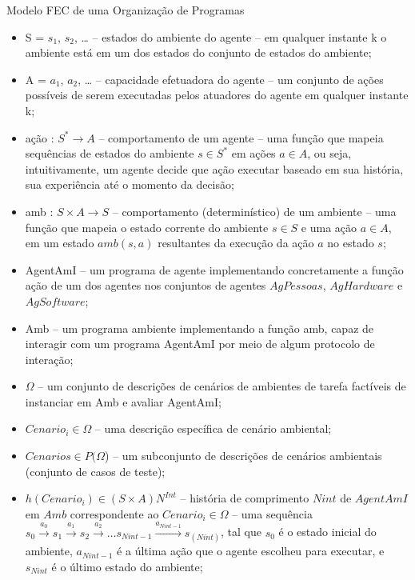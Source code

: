 \begin{section}{Modelo FEC de uma Organização de Programas}
    \begin{itemize}
        
        \item S = {$s_1$, $s_2$, \ldots} -- estados do ambiente do agente – em qualquer instante k o ambiente está em um dos estados do conjunto de estados do ambiente;
        
        \item A = {$a_1$, $a_2$, \ldots} -- capacidade efetuadora do agente – um conjunto de ações possíveis de serem executadas pelos atuadores do agente em qualquer instante k;
        
        \item ação : $S^*  \rightarrow A$ -- comportamento de um agente -- uma função que mapeia sequências de estados do ambiente $s \in S^*$ em ações $a \in A$, ou seja, intuitivamente, um agente decide que ação executar baseado em sua história, sua experiência até o momento da decisão;
        
        \item amb : $S\times A  \rightarrow S$ -- comportamento (determinístico) de um ambiente – uma função que mapeia o estado corrente do ambiente $s \in S$ e uma ação $a \in A$, em um estado $amb(s,a)$ resultantes da execução da ação $a$ no estado $s$;
        
        \item AgentAmI -- um programa de agente implementando concretamente a função ação de um dos agentes nos conjuntos de agentes $AgPessoas$, $AgHardware$ e $AgSoftware$;
        
        \item Amb -- um programa ambiente implementando a função amb, capaz de interagir com um programa AgentAmI por meio de algum protocolo de interação;
        
        \item $\Omega$ -- um conjunto de descrições de cenários de ambientes de tarefa factíveis de instanciar em Amb e avaliar AgentAmI;
        
        \item $Cenario_i \in \Omega$ -- uma descrição específica de cenário ambiental;
        
        \item $Cenarios \in P(\Omega$) -- um subconjunto de descrições de cenários ambientais (conjunto de casos de teste);
        
        \item $h(Cenario_i) \in (S\times A)N^{Int}$ -- história de comprimento $Nint$ de $AgentAmI$ em $Amb$ correspondente ao $Cenario_i \in \Omega$ – uma sequência $s_0 \xrightarrow{a_0} s_1 \xrightarrow{a_1} s_2 \xrightarrow{a_2} \ldots s_{Nint-1} \xrightarrow{a_{Nint-1}} s_(Nint)$, tal que $s_0$ é o estado inicial do ambiente, $a_{Nint-1}$ é a última ação que o agente escolheu para executar, e $s_{Nint}$ é o último estado do ambiente;
        

\end{itemize}
\end{section}
